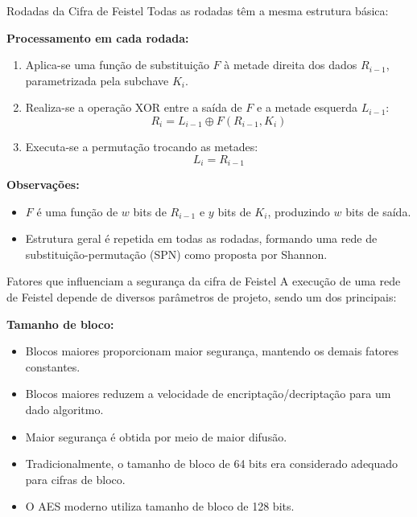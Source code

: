 \begin{frame}{Rodadas da Cifra de Feistel}
    Todas as rodadas têm a mesma estrutura básica:

    \medskip
    \textbf{Processamento em cada rodada:}
    \begin{enumerate}
        \item Aplica-se uma função de substituição $F$ à metade direita dos dados $R_{i-1}$, parametrizada pela subchave $K_i$.
        \item Realiza-se a operação XOR entre a saída de $F$ e a metade esquerda $L_{i-1}$:
              \[
                  R_i = L_{i-1} \oplus F(R_{i-1}, K_i)
              \]
        \item Executa-se a permutação trocando as metades:
              \[
                  L_i = R_{i-1}
              \]
    \end{enumerate}

    \medskip
    \textbf{Observações:}
    \begin{itemize}
        \item $F$ é uma função de $w$ bits de $R_{i-1}$ e $y$ bits de $K_i$, produzindo $w$ bits de saída.
        \item Estrutura geral é repetida em todas as rodadas, formando uma rede de substituição-permutação (SPN) como proposta por Shannon.
    \end{itemize}
\end{frame}

\begin{frame}{Fatores que influenciam a segurança da cifra de Feistel}
    A execução de uma rede de Feistel depende de diversos parâmetros de projeto, sendo um dos principais:

    \medskip
    \textbf{Tamanho de bloco:}
    \begin{itemize}
        \item Blocos maiores proporcionam maior segurança, mantendo os demais fatores constantes.
        \item Blocos maiores reduzem a velocidade de encriptação/decriptação para um dado algoritmo.
        \item Maior segurança é obtida por meio de maior difusão.
        \item Tradicionalmente, o tamanho de bloco de 64 bits era considerado adequado para cifras de bloco.
        \item O AES moderno utiliza tamanho de bloco de 128 bits.
    \end{itemize}
\end{frame}

